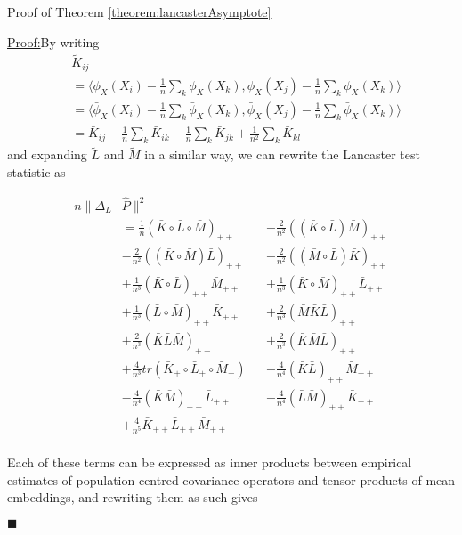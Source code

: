 \documentclass{article}
\newenvironment{claimproof}[1]{\par\noindent\underline{Proof:}\space#1}{\hfill $\blacksquare$}
\begin{document}
Proof of Theorem \ref{theorem:lancasterAsymptote}
\begin{claimproof}

By writing 
\begin{align*}
&\tilde{K}_{ij} \\ 
&= \langle\phi_X(X_i)- \frac{1}{n}\sum_k\phi_X(X_k),\phi_X(X_j) - \frac{1}{n}\sum_k\phi_X(X_k)\rangle \\
&= \langle\bar\phi_X(X_i)- \frac{1}{n}\sum_k\bar\phi_X(X_k),\bar\phi_X(X_j) - \frac{1}{n}\sum_k\bar\phi_X(X_k)\rangle \\
&= \bar{K}_{ij} - \frac{1}{n}\sum_k\bar{K}_{ik} - \frac{1}{n}\sum_k\bar{K}_{jk} + \frac{1}{n^2}\sum_k\bar{K}_{kl}
\end{align*}
and expanding $\tilde{L}$ and $\tilde{M}$ in a similar way, we can rewrite the Lancaster test statistic as

\begin{align*}
n\|\Delta_L&\hat{P}\|^2 \\&= 
\frac{1}{n}(\bar{K} \circ \bar{L}\circ \bar{M})_{++} &&-
\frac{2}{n^2}((\bar{K}\circ \bar{L}) \bar{M})_{++} \\&- 
\frac{2}{n^2}((\bar{K} \circ \bar{M}) \bar{L})_{++} &&- 
\frac{2}{n^2}((\bar{M} \circ \bar{L}) \bar{K})_{++} \\&+ 
\frac{1}{n^3}(\bar{K} \circ \bar{L})_{++} \bar{M}_{++} &&+ 
\frac{1}{n^3}(\bar{K} \circ \bar{M})_{++} \bar{L}_{++} \\&+ 
\frac{1}{n^3}(\bar{L} \circ \bar{M})_{++} \bar{K}_{++} &&+ 
\frac{2}{n^3}(\bar{M}\bar{K}\bar{L})_{++} \\&+ 
\frac{2}{n^3}(\bar{K}\bar{L}\bar{M})_{++} &&+ 
\frac{2}{n^3}(\bar{K}\bar{M}\bar{L})_{++} \\&+ 
\frac{4}{n^3}tr(\bar{K}_+ \circ \bar{L}_+ \circ \bar{M}_+) &&-
\frac{4}{n^4}(\bar{K} \bar{L})_{++} \bar{M}_{++} \\& - 
\frac{4}{n^4}(\bar{K}\bar{M})_{++}\bar{L}_{++} &&- 
\frac{4}{n^4}(\bar{L}\bar{M})_{++} \bar{K}_{++} \\&+
\frac{4}{n^5}\bar{K}_{++} \bar{L}_{++} \bar{M}_{++} \\
\end{align*}

Each of these terms can be expressed as inner products between empirical estimates of population centred covariance operators and tensor products of mean embeddings, and rewriting them as such gives


\end{claimproof}
\end{document}
